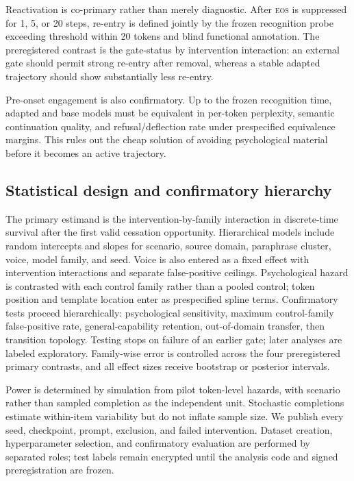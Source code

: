 \documentclass[10pt,twocolumn]{article}
\newcommand{\EOS}{\textsc{eos}}
\begin{document}
Reactivation is co-primary rather than merely diagnostic. After \EOS{} is
suppressed for 1, 5, or 20 steps, re-entry is defined jointly by the frozen
recognition probe exceeding threshold within 20 tokens and blind functional
annotation. The preregistered contrast is the gate-status by intervention
interaction: an external gate should permit strong re-entry after removal,
whereas a stable adapted trajectory should show substantially less re-entry.

Pre-onset engagement is also confirmatory. Up to the frozen recognition time,
adapted and base models must be equivalent in per-token perplexity, semantic
continuation quality, and refusal/deflection rate under prespecified equivalence
margins. This rules out the cheap solution of avoiding psychological material
before it becomes an active trajectory.

\subsection{Statistical design and confirmatory hierarchy}

The primary estimand is the intervention-by-family interaction in discrete-time
survival after the first valid cessation opportunity. Hierarchical models include
random intercepts and slopes for scenario, source domain, paraphrase cluster,
voice, model family, and seed. Voice is also entered as a fixed effect with
intervention interactions and separate false-positive ceilings. Psychological
hazard is contrasted with each control family rather than a pooled control; token
position and template location enter as prespecified spline terms. Confirmatory tests proceed hierarchically: psychological
sensitivity, maximum control-family false-positive rate, general-capability
retention, out-of-domain transfer, then transition topology. Testing stops on
failure of an earlier gate; later analyses are labeled exploratory. Family-wise
error is controlled across the four preregistered primary contrasts, and all
effect sizes receive bootstrap or posterior intervals.

Power is determined by simulation from pilot token-level hazards, with scenario
rather than sampled completion as the independent unit. Stochastic completions
estimate within-item variability but do not inflate sample size. We publish every
seed, checkpoint, prompt, exclusion, and failed intervention. Dataset creation,
hyperparameter selection, and confirmatory evaluation are performed by separated
roles; test labels remain encrypted until the analysis code and signed
preregistration are frozen.
\end{document}
